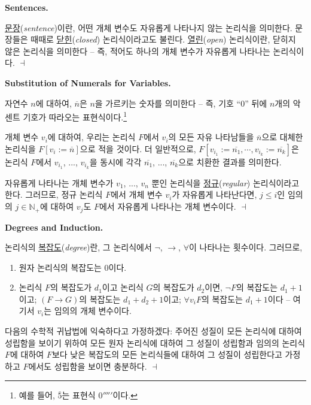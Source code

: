 \documentclass[12pt]{paper}
\newenvironment{context}[1][]
{ \noindent \textbf{{#1}.}
}
{ \hfill $ \dashv $
}
\begin{document}
  \begin{context}[Sentences]
    \underline{문장}(\textit{sentence})이란, 어떤 개체 변수도 자유롭게 나타나지 않는 논리식을 의미한다.
    문장들은 때때로 \underline{닫힌}(\textit{closed}) 논리식이라고도 불린다.
    \underline{열린}(\textit{open}) 논리식이란, 닫히지 않은 논리식을 의미한다 --
    즉, 적어도 하나의 개체 변수가 자유롭게 나타나는 논리식이다.
  \end{context}

  \begin{context}[Substitution of Numerals for Variables]
    자연수 $n$에 대하여, $\overline{n}$은 $n$을 가르키는 숫자를 의미한다 --
    즉, 기호 ``$0$'' 뒤에 $n$개의 악센트 기호가 따라오는 표현식이다.\footnote
    {
      예를 들어, $\overline{5}$는 표현식 $0'''''$이다.
    }

    개체 변수 $v_{i}$에 대하여, 우리는 논리식 $F$에서 $v_{i}$의 모든 자유 나타남들을 $\overline{n}$으로 대체한 논리식을 $F \left[ v_{i} := \overline{n} \right]$으로 적을 것이다.
    더 일반적으로, $F \left[ v_{i_{1}} := \overline{n_{1}} , \cdots , v_{i_{k}} := \overline{n_{k}} \right]$은 논리식 $F$에서 $v_{i_{1}}$, ..., $v_{i_{k}}$을 동시에 각각 $\overline{n_{1}}$, ..., $\overline{n_{k}}$으로 치환한 결과를 의미한다.

    자유롭게 나타나는 개체 변수가 $v_{1}$, ..., $v_{n}$ 뿐인 논리식을 \underline{정규}(\textit{regular}) 논리식이라고 한다.
    그러므로, 정규 논리식 $F$에서 개체 변수 $v_{i}$가 자유롭게 나타난다면,
    $j \leq i$인 임의의 $j \in \mathbb{N}_{+}$에 대하여 $v_{j}$도 $F$에서 자유롭게 나타나는 개체 변수이다.
  \end{context}

  \begin{context}[Degrees and Induction]
    논리식의 \underline{복잡도}(\textit{degree})란, 그 논리식에서 $\lnot$, $\rightarrow$, $\forall$이 나타나는 횟수이다.
    그러므로,
    \begin{enumerate}
      \item 원자 논리식의 복잡도는 $0$이다.
      \item 논리식 $F$의 복잡도가 $d_{1}$이고 논리식 $G$의 복잡도가 $d_{2}$이면,
      $\lnot F$의 복잡도는 $d_{1} + 1$이고;
      $\left( F \rightarrow G \right)$의 복잡도는 $d_{1} + d_{2} + 1$이고;
      $\forall v_{i} F$의 복잡도는 $d_{1} + 1$이다 --
      여기서 $v_{i}$는 임의의 개체 변수이다.
    \end{enumerate}

    다음의 수학적 귀납법에 익숙하다고 가정하겠다:
    주어진 성질이 모든 논리식에 대하여 성립함을 보이기 위하여
    모든 원자 논리식에 대하여 그 성질이 성립함과
    임의의 논리식 $F$에 대하여 $F$보다 낮은 복잡도의 모든 논리식들에 대하여 그 성질이 성립한다고 가정하고
    $F$에서도 성립함을 보이면 충분하다.
  \end{context}
\end{document}
